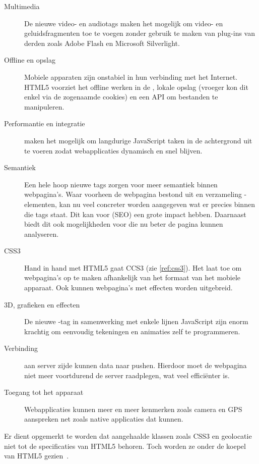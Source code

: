 \begin{description}
\item [Multimedia] De nieuwe video- en audiotags maken het mogelijk om video- en geluidsfragmenten toe te voegen zonder gebruik te maken van plug-ins van derden zoals Adobe Flash en Microsoft Silverlight.

\item [Offline en opslag]  Mobiele apparaten zijn onstabiel in hun verbinding met het Internet. HTML5 voorziet het offline werken in de , lokale opslag (vroeger kon dit enkel via de zogenaamde cookies) en een API om bestanden te manipuleren.

\item [Performantie en integratie]   maken het mogelijk om langdurige JavaScript taken in de achtergrond uit te voeren zodat webapplicaties dynamisch en snel blijven.

\item [Semantiek]  Een hele hoop nieuwe tags zorgen voor meer semantiek binnen webpagina's. 
Waar voorheen de webpagina bestond uit en verzameling -elementen, kan nu veel concreter worden aangegeven wat er precies binnen die tags staat. 
Dit kan voor  (SEO) een grote impact hebben. 
Daarnaast biedt dit ook mogelijkheden voor  die nu beter de pagina kunnen analyseren.

\item [CSS3]  Hand in hand met HTML5 gaat CCS3 (zie \ref{ref:css3}). 
Het laat toe om webpagina's op te maken afhankelijk van het formaat van het mobiele apparaat. 
Ook kunnen webpagina's met effecten worden uitgebreid. 

\item [3D, grafieken en effecten]  De nieuwe -tag in samenwerking met enkele lijnen JavaScript zijn enorm krachtig om eenvoudig tekeningen en animaties zelf te programmeren.

\item [Verbinding]   aan server zijde kunnen data naar  pushen. Hierdoor moet de webpagina niet meer voortdurend de server raadplegen, wat veel efficiënter is.

\item [Toegang tot het apparaat] Webapplicaties kunnen meer en meer kenmerken zoals camera en GPS aanspreken net zoals native applicaties dat kunnen. 
\end{description}

Er dient opgemerkt te worden dat aangehaalde klassen zoals CSS3 en geolocatie niet tot de specificaties van HTML5 behoren. 
Toch worden ze onder de koepel van HTML5 gezien~\cite{MacDonald2011}.

